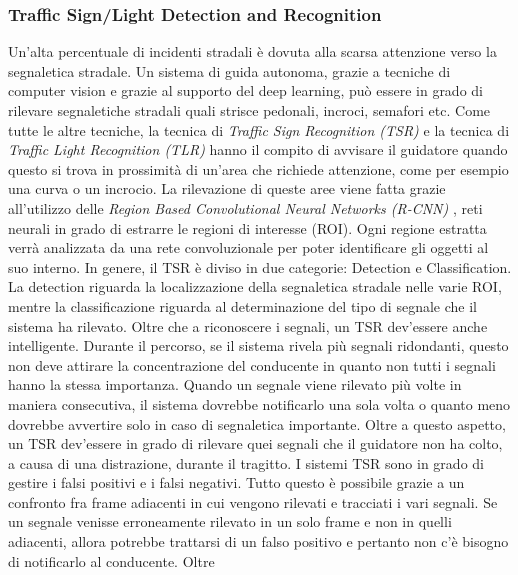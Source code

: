 \subsubsection{Traffic Sign/Light Detection and Recognition}
Un'alta percentuale di incidenti stradali è dovuta alla scarsa attenzione verso 
la segnaletica stradale. Un sistema di guida autonoma, grazie a tecniche di 
computer vision e grazie al supporto del deep learning, può essere in grado 
di rilevare segnaletiche stradali quali strisce pedonali, incroci, semafori etc. 
Come tutte le altre tecniche, la tecnica di \emph{Traffic Sign Recognition (TSR)} e 
la tecnica di \emph{Traffic Light Recognition (TLR)} hanno il compito di avvisare 
il guidatore quando questo si trova in prossimità di un'area che richiede 
attenzione, come per esempio una curva o un incrocio. La rilevazione di 
queste aree viene fatta grazie all'utilizzo delle \emph{Region Based Convolutional 
Neural Networks (R-CNN)} \cite{RCNN-TLR}, reti neurali in grado di estrarre le regioni 
di interesse (ROI). Ogni regione estratta verrà analizzata da una rete 
convoluzionale per poter identificare gli oggetti al suo interno. In genere, 
il TSR è diviso in due categorie: Detection e Classification. La detection 
riguarda la localizzazione  della segnaletica stradale nelle varie ROI, mentre la 
classificazione riguarda al determinazione del tipo di segnale che il sistema 
ha rilevato. Oltre che a riconoscere i segnali, un TSR dev'essere anche 
intelligente. Durante il percorso, se il sistema rivela più segnali ridondanti, 
questo non deve attirare la concentrazione del conducente in quanto non tutti 
i segnali hanno la stessa importanza. Quando un segnale viene rilevato più 
volte in maniera consecutiva, il sistema dovrebbe notificarlo una sola volta 
o quanto meno dovrebbe avvertire solo in caso di segnaletica importante. 
Oltre a questo aspetto, un TSR dev'essere in grado di rilevare quei segnali 
che il guidatore non ha colto, a causa di una distrazione, durante il tragitto. 
I sistemi TSR sono in grado di gestire i falsi positivi e i falsi negativi. Tutto 
questo è possibile grazie a un confronto fra frame adiacenti in cui vengono 
rilevati e tracciati i vari segnali. Se un segnale venisse erroneamente rilevato 
in un solo frame e non in quelli adiacenti, allora potrebbe trattarsi di un 
falso positivo e pertanto non c'è bisogno di notificarlo al conducente. Oltre 
